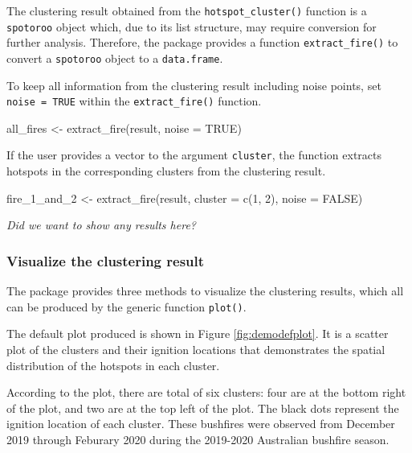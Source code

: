 The clustering result obtained from the \texttt{hotspot\_cluster()}
function is a \texttt{spotoroo} object which, due to its list structure,
may require conversion for further analysis. Therefore, the package
provides a function \texttt{extract\_fire()} to convert a
\texttt{spotoroo} object to a \texttt{data.frame}.

To keep all information from the clustering result including noise
points, set \texttt{noise\ =\ TRUE} within the \texttt{extract\_fire()}
function.

\begin{Schunk}
\begin{Sinput}
all_fires <- extract_fire(result, noise = TRUE)
\end{Sinput}
\end{Schunk}

If the user provides a vector to the argument \texttt{cluster}, the
function extracts hotspots in the corresponding clusters from the
clustering result.

\begin{Schunk}
\begin{Sinput}
fire_1_and_2 <- extract_fire(result, cluster = c(1, 2), noise = FALSE)
\end{Sinput}
\end{Schunk}

\textit{Did we want to show any results here?}

\hypertarget{visualize-the-clustering-result}{%
\subsubsection{Visualize the clustering
result}\label{visualize-the-clustering-result}}

The package provides three methods to visualize the clustering results,
which all can be produced by the generic function \texttt{plot()}.

The default plot produced is shown in Figure \ref{fig:demodefplot}. It
is a scatter plot of the clusters and their ignition locations that
demonstrates the spatial distribution of the hotspots in each cluster.

According to the plot, there are total of six clusters: four are at the
bottom right of the plot, and two are at the top left of the plot. The
black dots represent the ignition location of each cluster. These
bushfires were observed from December 2019 through Feburary 2020 during
the 2019-2020 Australian bushfire season.

